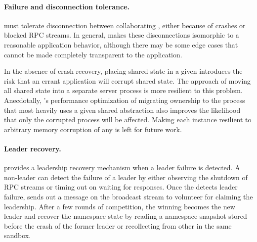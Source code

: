 \paragraph{Failure and disconnection tolerance.}  
\thelibos{} must tolerate disconnection between collaborating \picoprocs{},
either because of crashes or blocked RPC streams.  In general, \thelibos{} makes 
these disconnections isomorphic to a reasonable application behavior,
although there may be some edge cases that cannot be made completely transparent to the application.

In the absence of crash recovery, placing shared state in a given \picoproc{} introduces the risk that an errant 
application will corrupt shared \libos{} state.  The \microkernel{} approach of 
moving all shared state into a separate server process is more resilient to this problem.
Anecdotally, \thelibos{}'s performance optimization of migrating ownership to the process that 
most heavily uses a given shared abstraction also improves the likelihood that only the corrupted
process will be affected.  
Making each \thelibos{} instance resilient to arbitrary memory corruption of any \picoproc{} is left for future work.


\paragraph{Leader recovery.}
\thelibos{} provides a leadership recovery mechanism when a leader failure is detected.
A non-leader \picoproc{} can detect the failure of a leader by either observing the shutdown of RPC streams or timing out on waiting for responses. 
Once the \picoproc{} detects leader failure, \thelibos{} sends out a message on the broadcast stream to volunteer for claiming the leadership.
After a few rounds of competition, the winning \picoproc{} becomes the new leader and recover the namespace state by reading a namespace snapshot stored before the crash of the former leader
or recollecting from other \picoprocs{} in the same sandbox.


